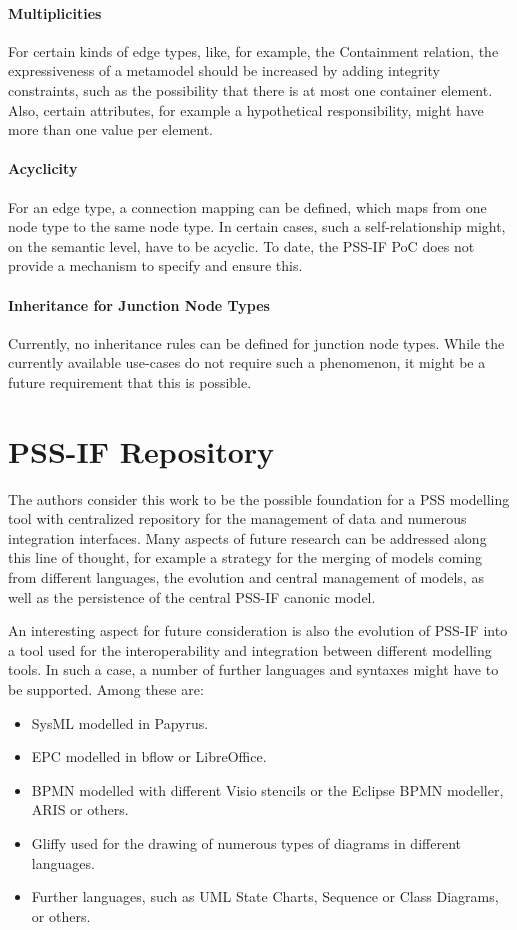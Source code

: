 \paragraph{Multiplicities}

For certain kinds of edge types, like, for example, the Containment relation, the expressiveness of a metamodel should be increased by adding integrity constraints, such as the possibility that there is at most one container element. Also, certain attributes, for example a hypothetical responsibility, might have more than one value per element.

\paragraph{Acyclicity}

For an edge type, a connection mapping can be defined, which maps from one node type to the same node type. In certain cases, such a self-relationship might, on the semantic level, have to be acyclic. To date, the PSS-IF PoC does not provide a mechanism to specify and ensure this.

\paragraph{Inheritance for Junction Node Types}

Currently, no inheritance rules can be defined for junction node types. While the currently available use-cases do not require such a phenomenon, it might be a future requirement that this is possible.

\section{PSS-IF Repository}
\label{sec:outlook:repo}

The authors consider this work to be the possible foundation for a PSS modelling tool with centralized repository for the management of data and numerous integration interfaces. Many aspects of future research can be addressed along this line of thought, for example a strategy for the merging of models coming from different languages, the evolution and central management of models, as well as the persistence of the central PSS-IF canonic model.

An interesting aspect for future consideration is also the evolution of PSS-IF into a tool used for the interoperability and integration between different modelling tools. In such a case, a number of further languages and syntaxes might have to be supported. Among these are:

\begin{itemize}
\item SysML modelled in Papyrus.
\item EPC modelled in bflow or LibreOffice.
\item BPMN modelled with different Visio stencils or the Eclipse BPMN modeller, ARIS or others.
\item Gliffy used for the drawing of numerous types of diagrams in different languages.
\item Further languages, such as UML State Charts, Sequence or Class Diagrams, or others.
\end{itemize}